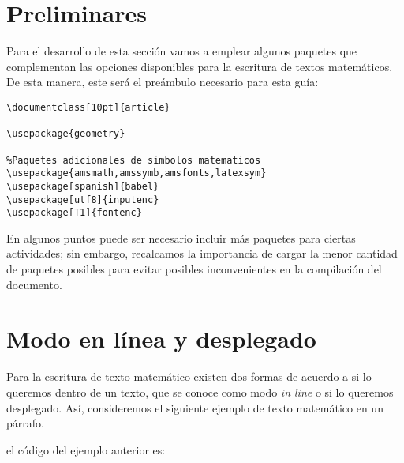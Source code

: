 \documentclass[a4,10pt]{aleph-notas}
\theoremstyle{definition}
\theoremstyle{plain}
\begin{document}
\encabezado

\informacion

\color{black}
\normalsize

\tableofcontents

\section{Preliminares}

Para el desarrollo de esta sección vamos a emplear algunos paquetes que complementan las opciones disponibles para la escritura de textos matemáticos. De esta manera, este será el preámbulo necesario para esta guía:

\begin{lstlisting}[frame=single]
\documentclass[10pt]{article}

\usepackage{geometry}

%Paquetes adicionales de simbolos matematicos
\usepackage{amsmath,amssymb,amsfonts,latexsym}
\usepackage[spanish]{babel}
\usepackage[utf8]{inputenc}
\usepackage[T1]{fontenc}
\end{lstlisting}

\begin{advertencia}
En algunos puntos puede ser necesario incluir más paquetes para ciertas actividades; sin embargo, recalcamos la importancia de cargar la menor cantidad de paquetes posibles para evitar posibles inconvenientes en la compilación del documento.
\end{advertencia}

\section{Modo en línea y desplegado}

Para la escritura de texto matemático existen dos formas de acuerdo a si lo queremos dentro de un texto, que se conoce como modo \textit{in line} o si lo queremos desplegado. Así, consideremos el siguiente ejemplo de texto matemático en un párrafo.

\begin{center}
{ \fboxsep 12pt
 }
\end{center}

\noindent
el código del ejemplo anterior es: 
\end{document}
